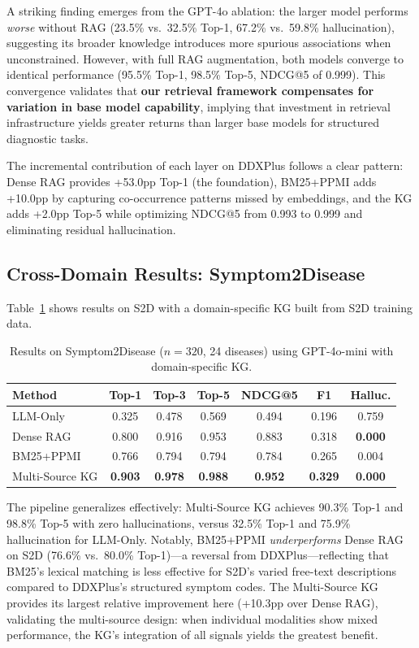 \documentclass[preprint,12pt]{elsarticle}
\begin{document}
A striking finding emerges from the GPT-4o ablation: the larger model performs \emph{worse} without RAG (23.5\% vs.\ 32.5\% Top-1, 67.2\% vs.\ 59.8\% hallucination), suggesting its broader knowledge introduces more spurious associations when unconstrained. However, with full RAG augmentation, both models converge to identical performance (95.5\% Top-1, 98.5\% Top-5, NDCG@5 of 0.999). This convergence validates that \textbf{our retrieval framework compensates for variation in base model capability}, implying that investment in retrieval infrastructure yields greater returns than larger base models for structured diagnostic tasks.

The incremental contribution of each layer on DDXPlus follows a clear pattern: Dense RAG provides +53.0pp Top-1 (the foundation), BM25+PPMI adds +10.0pp by capturing co-occurrence patterns missed by embeddings, and the KG adds +2.0pp Top-5 while optimizing NDCG@5 from 0.993 to 0.999 and eliminating residual hallucination.

\subsection{Cross-Domain Results: Symptom2Disease}
\label{sec:cross_domain}

Table~\ref{tab:s2d} shows results on S2D with a domain-specific KG built from S2D training data.

\begin{table}[t]
\centering
{\small
\caption{Results on Symptom2Disease ($n{=}320$, 24 diseases) using GPT-4o-mini with domain-specific KG.}
\label{tab:s2d}
\begin{tabular}{lcccccc}
\toprule
\textbf{Method} & \textbf{Top-1} & \textbf{Top-3} & \textbf{Top-5} & \textbf{NDCG@5} & \textbf{F1} & \textbf{Halluc.} \\
\midrule
LLM-Only       & 0.325 & 0.478 & 0.569 & 0.494 & 0.196 & 0.759 \\
Dense RAG       & 0.800 & 0.916 & 0.953 & 0.883 & 0.318 & \textbf{0.000} \\
BM25+PPMI       & 0.766 & 0.794 & 0.794 & 0.784 & 0.265 & 0.004 \\
Multi-Source KG & \textbf{0.903} & \textbf{0.978} & \textbf{0.988} & \textbf{0.952} & \textbf{0.329} & \textbf{0.000} \\
\bottomrule
\end{tabular}
}
\end{table}

The pipeline generalizes effectively: Multi-Source KG achieves 90.3\% Top-1 and 98.8\% Top-5 with zero hallucinations, versus 32.5\% Top-1 and 75.9\% hallucination for LLM-Only. Notably, BM25+PPMI \emph{underperforms} Dense RAG on S2D (76.6\% vs.\ 80.0\% Top-1)---a reversal from DDXPlus---reflecting that BM25's lexical matching is less effective for S2D's varied free-text descriptions compared to DDXPlus's structured symptom codes. The Multi-Source KG provides its largest relative improvement here (+10.3pp over Dense RAG), validating the multi-source design: when individual modalities show mixed performance, the KG's integration of all signals yields the greatest benefit.
\end{document}
